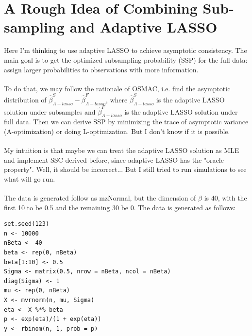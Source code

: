 \documentclass[]{article}
\begin{document}
\section{A Rough Idea of Combining Sub-sampling and Adaptive LASSO}
Here I’m thinking to use adaptive LASSO to achieve asymptotic consistency. The main goal is to get the optimized subsampling probability (SSP) for the full data: assign larger probabilities to observations with more information.\\
\\
To do that, we may follow the rationale of OSMAC, i.e. find the asymptotic distribution of $\hat{\beta}_{A-lasso}^{S}-\hat{\beta}_{A-lasso}^{F}$, where $\hat{\beta}_{A-lasso}^{S}$ is the adaptive LASSO solution under subsamples and $\hat{\beta}_{A-lasso}^{F}$ is the adaptive LASSO solution under full data. Then we can derive SSP by minimizing the trace of asymptotic variance (A-optimization) or doing L-optimization. But I don’t know if it is possible.\\
\\
My intuition is that maybe we can treat the adaptive LASSO solution as MLE and implement SSC derived before, since adaptive LASSO has the "oracle property". Well, it should be incorrect...
But I still tried to run simulations to see what will go run.\\
\\
The data is generated follow as mzNormal, but the dimension of $\beta$ is 40, with the first 10 to be 0.5 and the remaining 30 be 0. The data is generated as follows:\\
\begin{lstlisting}
set.seed(123)
n <- 10000
nBeta <- 40
beta <- rep(0, nBeta)
beta[1:10] <- 0.5
Sigma <- matrix(0.5, nrow = nBeta, ncol = nBeta)
diag(Sigma) <- 1
mu <- rep(0, nBeta)
X <- mvrnorm(n, mu, Sigma)
eta <- X %*% beta
p <- exp(eta)/(1 + exp(eta))
y <- rbinom(n, 1, prob = p)
\end{lstlisting}
\end{document}
